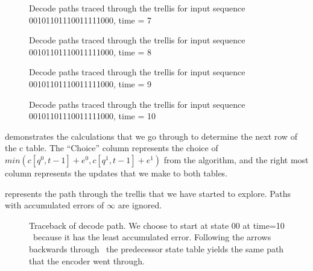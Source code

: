 \begin{figure}
\center
\epsfxsize=5.5in
\caption{Decode paths traced through the trellis for input sequence 00101101110011111000, time = 7}

\epsfxsize=5.5in
\caption{Decode paths traced through the trellis for input sequence 00101101110011111000, time = 8}

\epsfxsize=5.5in
\caption{Decode paths traced through the trellis for input sequence 00101101110011111000, time = 9}

\label{fig:trellis-decode-3}
\end{figure}


\begin{figure}
\center
\epsfxsize=5.5in
\caption{Decode paths traced through the trellis for input sequence 00101101110011111000, time = 10}
\label{fig:trellis-decode-3}
\end{figure}


demonstrates the calculations that we go through to 
determine the next row of the c table. The ``Choice'' column represents the choice of
$min(c[q^0,t-1] + e^0, c[q^1,t-1] + e^1)$ from the algorithm, and the right most column
represents the updates that we make to both tables.

represents the path through the trellis	 
that we have started to explore. Paths with accumulated errors of $\infty$ are ignored.

\begin{figure}
\center
\epsfxsize=5.5in
\caption{Traceback of decode path. We choose to start at state 00 at time=10 \
         because it has the least accumulated error. Following the arrows backwards through \
	 the predecessor state table yields the same path that the encoder went through.}
\label{fig:decode_traceback}
\end{figure}



